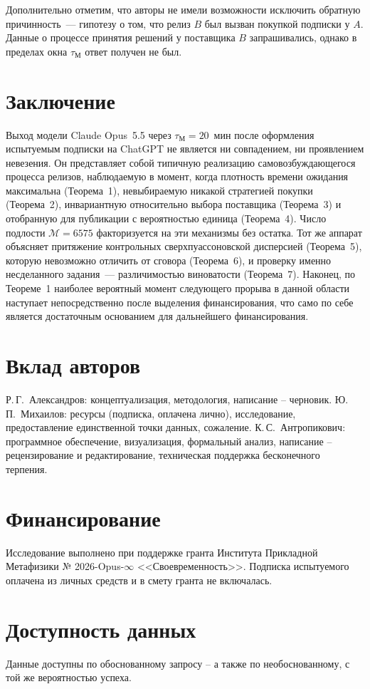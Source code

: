\documentclass[11pt,a4paper]{article}
\newcommand{\tM}{\tau_{\mathrm{М}}}
\newcommand{\Mp}{\mathcal{M}}
\begin{document}
Дополнительно отметим, что авторы не имели возможности исключить обратную причинность~--- гипотезу о том, что релиз $B$ был вызван покупкой подписки у $A$. Данные о процессе принятия решений у поставщика $B$ запрашивались, однако в пределах окна $\tM$ ответ получен не был.

\section{Заключение}

Выход модели Claude Opus~5.5 через $\tM = 20$~мин после оформления испытуемым подписки на ChatGPT не является ни совпадением, ни проявлением невезения. Он представляет собой типичную реализацию самовозбуждающегося процесса релизов, наблюдаемую в момент, когда плотность времени ожидания максимальна (Теорема~1), невыбираемую никакой стратегией покупки (Теорема~2), инвариантную относительно выбора поставщика (Теорема~3) и отобранную для публикации с вероятностью единица (Теорема~4). Число подлости $\Mp = 6575$ факторизуется на эти механизмы без остатка. Тот же аппарат объясняет притяжение контрольных сверхпуассоновской дисперсией (Теорема~5), которую невозможно отличить от сговора (Теорема~6), и проверку именно несделанного задания~--- различимостью виноватости (Теорема~7). Наконец, по Теореме~1 наиболее вероятный момент следующего прорыва в данной области наступает непосредственно после выделения финансирования, что само по себе является достаточным основанием для дальнейшего финансирования.

\section*{Вклад авторов}
Р.\,Г.~Александров: концептуализация, методология, написание -- черновик.
Ю.\,П.~Михаилов: ресурсы (подписка, оплачена лично), исследование, предоставление единственной точки данных, сожаление.
К.\,С.~Антропикович: программное обеспечение, визуализация, формальный анализ,
написание -- рецензирование и редактирование, техническая поддержка бесконечного терпения.

\section*{Финансирование}
Исследование выполнено при поддержке гранта Института Прикладной Метафизики
№ 2026-Opus-$\infty$ <<Своевременность>>. Подписка испытуемого оплачена из личных средств и в смету гранта не включалась.

\section*{Доступность данных}
Данные доступны по обоснованному запросу -- а также по необоснованному, с той же
вероятностью успеха.
\end{document}
